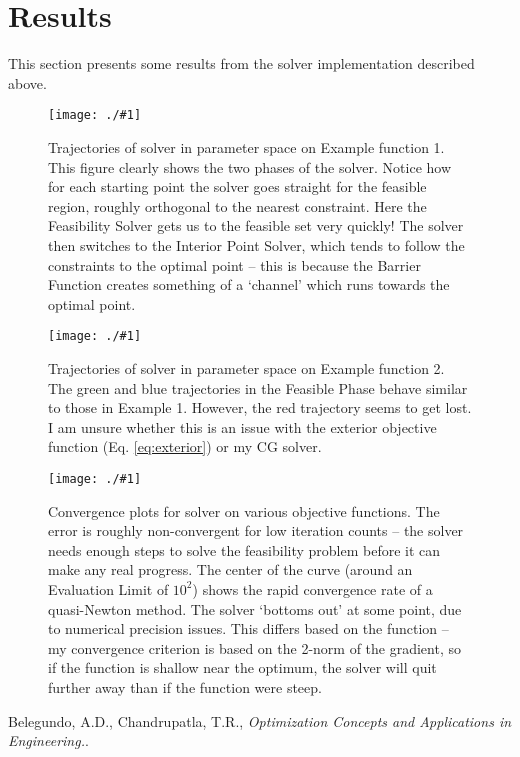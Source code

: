 \documentclass{article}
\newcommand{\img}[2]{
	\begin{figure}[H]
	\centering%
	\texttt{[image: ./\#1]}
	\caption{#2}     %
	\label{fig:#1}   %
	\end{figure} }
\begin{document}
\section{Results}
This section presents some results from the solver implementation described above.

\img{trajectories_1}{Trajectories of solver in parameter space on Example function 1. This figure clearly shows the two phases of the solver. Notice how for each starting point the solver goes straight for the feasible region, roughly orthogonal to the nearest constraint. Here the Feasibility Solver gets us to the feasible set very quickly! The solver then switches to the Interior Point Solver, which tends to follow the constraints to the optimal point -- this is because the Barrier Function creates something of a `channel' which runs towards the optimal point.}

\img{trajectories_2}{Trajectories of solver in parameter space on Example function 2. The green and blue trajectories in the Feasible Phase behave similar to those in Example 1. However, the red trajectory seems to get lost. I am unsure whether this is an issue with the exterior objective function (Eq. \ref{eq:exterior}) or my CG solver.}

\img{convergence}{Convergence plots for solver on various objective functions. The error is roughly non-convergent for low iteration counts -- the solver needs enough steps to solve the feasibility problem before it can make any real progress. The center of the curve (around an Evaluation Limit of $10^2$) shows the rapid convergence rate of a quasi-Newton method. The solver `bottoms out' at some point, due to numerical precision issues. This differs based on the function -- my convergence criterion is based on the 2-norm of the gradient, so if the function is shallow near the optimum, the solver will quit further away than if the function were steep.}


\begin{thebibliography}{99}

Belegundo, A.D., Chandrupatla, T.R.,
\newblock \emph{Optimization Concepts and Applications in Engineering.}.

\end{thebibliography}
\end{document}
